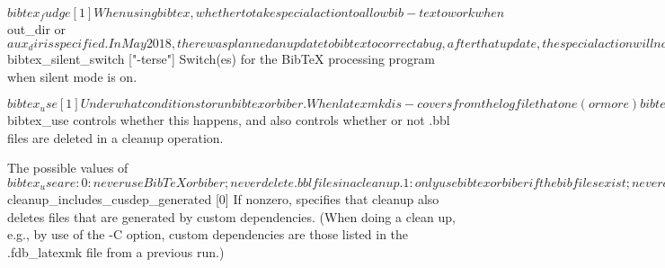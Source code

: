        $bibtex_fudge [1]
              When using bibtex, whether to take special action to allow  bib-
              tex  to  work  when  $out_dir  or $aux_dir is specified.  In May
              2018, there was planned an update to bibtex to  correct  a  bug,
              after  that  update,  the  special  action will no longer be re-
              quired.

       $bibtex_silent_switch ["-terse"]
              Switch(es) for the BibTeX processing program when silent mode is
              on.

       $bibtex_use [1]
              Under what conditions to run bibtex or biber.  When latexmk dis-
              covers from the log file that one (or more)  bibtex/biber-gener-
              ated  bibliographies  are used, it can run bibtex or biber when-
              ever it appears necessary to regenerate  the  bbl  file(s)  from
              their  source  bib  database  file(s).   But  sometimes, the bib
              file(s) are not available (e.g., for a document obtained from an
              external archive), but the bbl files are provided.  In that case
              use of bibtex or biber will result in incorrect  overwriting  of
              the  precious  bbl  files.   The  variable  $bibtex_use controls
              whether this happens, and also  controls  whether  or  not  .bbl
              files are deleted in a cleanup operation.

              The possible values of $bibtex_use are:
                0:  never  use  BibTeX  or biber; never delete .bbl files in a
              cleanup.
                1: only use bibtex or biber if  the  bib  files  exist;  never
              delete .bbl files in a cleanup.
                1.5:  only  use bibtex or biber if the bib files exist; condi-
              tionally delete .bbl files in a cleanup (i.e., delete them  only
              when the bib files all exist).
                2: run bibtex or biber whenever it appears necessary to update
              the bbl files, without testing for  the  existence  of  the  bib
              files; always delete .bbl files in a cleanup.

              Note  that  the value 1.5 does not work properly if the document
              uses biber instead of bibtex.  (There's a long story why not.)


       $cleanup_includes_cusdep_generated [0]
              If nonzero, specifies that cleanup also deletes files  that  are
              generated by custom dependencies.  (When doing a clean up, e.g.,
              by use of the -C option, custom dependencies are those listed in
              the .fdb_latexmk file from a previous run.)

